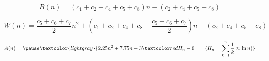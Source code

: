 \begin{frame}{}

  \pause
  \[
    B(n) = (c_1 + c_2 + c_4 + c_5 + c_8) n - (c_2 + c_4 + c_5 + c_8)
  \]

  \pause
  \[
    W(n) = \frac{c_5 + c_6 + c_7}{2} n^2 
        + (c_1 + c_2 + c_4 + c_8 - \frac{c_5 + c_6 + c_7}{2}) n
        - (c_2 + c_4 + c_5 + c_8)
  \]

  \pause
  \[
    A(n) = \pause \textcolor{lightgray}{2.25 n^2 + 7.75 n - 3 \red{H_n} - 6 \qquad (H_n = \sum_{k=1}^{n} \frac{1}{k}\approx \ln n)}
  \]
\end{frame}
